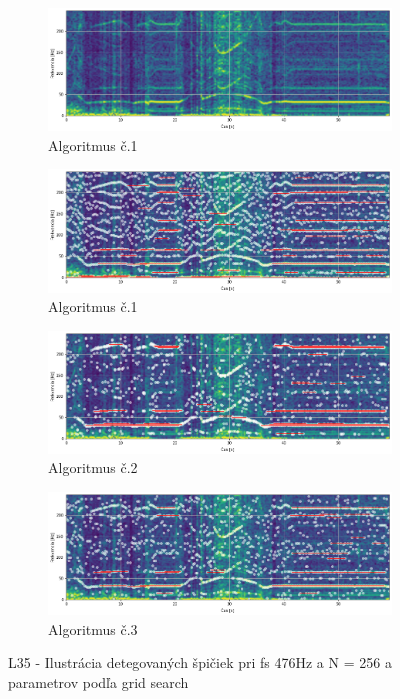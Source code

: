 \begin{figure}[h]
	\centering
	\begin{subfigure}{\textwidth}
        \centering
     	\includegraphics[width=\textwidth]{figures/verification/L35-dataset-spectrum.png}
     	\caption{Algoritmus č.1}
     \end{subfigure}
     \begin{subfigure}{\textwidth}
        \centering
     	\includegraphics[width=\textwidth]{figures/verification/L35-dataset-A1.png}
     	\caption{Algoritmus č.1}
     \end{subfigure}
     \begin{subfigure}{\textwidth}
    	\centering
        \includegraphics[width=\textwidth]{figures/verification/L35-dataset-A2.png}
        \caption{Algoritmus č.2}
     \end{subfigure}
      \begin{subfigure}{\textwidth}
    	\centering
        \includegraphics[width=\textwidth]{figures/verification/L35-dataset-A3.png}
        \caption{Algoritmus č.3}
     \end{subfigure}     
     \caption{L35 - Ilustrácia detegovaných špičiek pri fs 476Hz a N = 256 a parametrov podľa grid search}
\end{figure}

\emptypage
